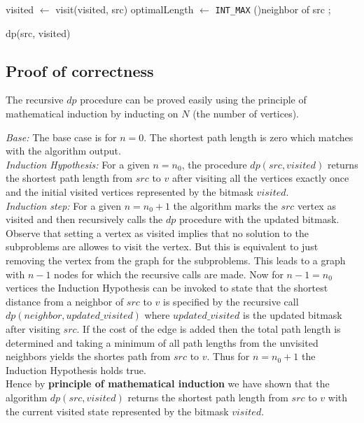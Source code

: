 \documentclass{article}
\begin{document}
\begin{algorithm}[H]
    \SetAlgoLined
    visited $\gets$ visit(visited, src)\;
    optimalLength $\gets$ \verb|INT_MAX|\;
    \ForAll(){neighbor of src}{
    }
    ;
    \caption{dp(src, visited)}
\end{algorithm}


\subsection{Proof of correctness}
The recursive $dp$ procedure can be proved easily using the principle of mathematical induction by inducting on $N$ (the number of vertices).

\textit{Base:}  The base case is for $n = 0$. The shortest path length is zero which matches with the algorithm output.\\

\textit{Induction Hypothesis: } For a given $n = n_0$, the procedure $dp(src, visited)$ returns the shortest path length from $src$ to $v$ after visiting all the vertices
exactly once and the initial visited vertices represented by the bitmask $visited$.\\

\textit{Induction step:} For a given $n = n_0 + 1$ the algorithm marks the $src$ vertex as visited and then recursively calls the $dp$ procedure
with the updated bitmask. Observe that setting a vertex as visited implies that no solution to the subproblems are allowes to visit the vertex.
But this is equivalent to just removing the vertex from the graph for the subproblems. This leads to a graph with $n - 1$ nodes for which the recursive calls 
are made. Now for $n - 1 = n_0$ vertices the Induction Hypothesis can be invoked to state that the shortest distance from a neighbor of $src$ to $v$ is specified
by the recursive call $dp(neighbor, updated\_visited)$ where $updated\_visited$ is the updated bitmask after visiting $src$. If the cost of the edge is added
then the total path length is determined and taking a minimum of all path lengths from the unvisited neighbors yields the shortes path from $src$ to $v$.
Thus for $n = n_0 + 1$ the Induction Hypothesis holds true.\\


Hence by \textbf{principle of mathematical induction} we have shown that the algorithm $dp(src, visited)$ returns the shortest path length from $src$ to $v$ with the current visited
state represented by the bitmask $visited$.
\end{document}
